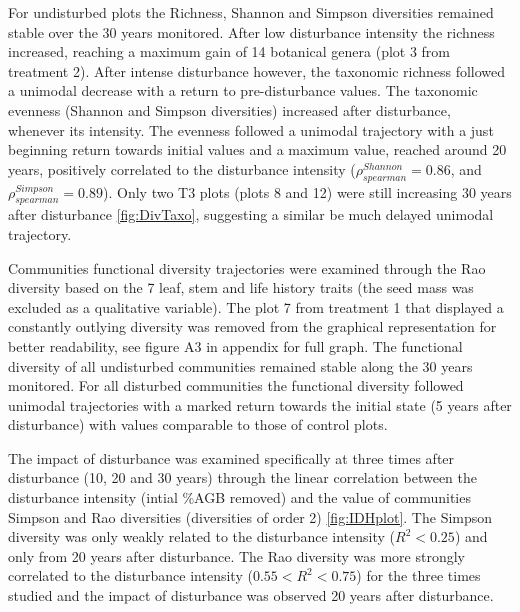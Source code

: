 \documentclass[fleqn,10pt]{ArtEcoFoG} %
\theoremstyle{definition}
\theoremstyle{definition}
\theoremstyle{definition}
\theoremstyle{remark}
\begin{document}
For undisturbed plots the Richness, Shannon and Simpson diversities
remained stable over the 30 years monitored. After low disturbance
intensity the richness increased, reaching a maximum gain of 14
botanical genera (plot 3 from treatment 2). After intense disturbance
however, the taxonomic richness followed a unimodal decrease with a
return to pre-disturbance values. The taxonomic evenness (Shannon and
Simpson diversities) increased after disturbance, whenever its
intensity. The evenness followed a unimodal trajectory with a just
beginning return towards initial values and a maximum value, reached
around 20 years, positively correlated to the disturbance intensity
(\(\rho_{spearman}^{Shannon}=0.86\), and
\(\rho_{spearman}^{Simpson}=0.89\)). Only two T3 plots (plots 8 and 12)
were still increasing 30 years after disturbance \ref{fig:DivTaxo},
suggesting a similar be much delayed unimodal trajectory.

Communities functional diversity trajectories were examined through the
Rao diversity based on the 7 leaf, stem and life history traits (the
seed mass was excluded as a qualitative variable). The plot 7 from
treatment 1 that displayed a constantly outlying diversity was removed
from the graphical representation for better readability, see figure A3
in appendix for full graph. The functional diversity of all undisturbed
communities remained stable along the 30 years monitored. For all
disturbed communities the functional diversity followed unimodal
trajectories with a marked return towards the initial state (5 years
after disturbance) with values comparable to those of control plots.

The impact of disturbance was examined specifically at three times after
disturbance (10, 20 and 30 years) through the linear correlation between
the disturbance intensity (intial \%AGB removed) and the value of
communities Simpson and Rao diversities (diversities of order 2)
\ref{fig:IDHplot}. The Simpson diversity was only weakly related to the
disturbance intensity (\(R^2<0.25\)) and only from 20 years after
disturbance. The Rao diversity was more strongly correlated to the
disturbance intensity (\(0.55<R^2<0.75\)) for the three times studied
and the impact of disturbance was observed 20 years after disturbance.
\end{document}
